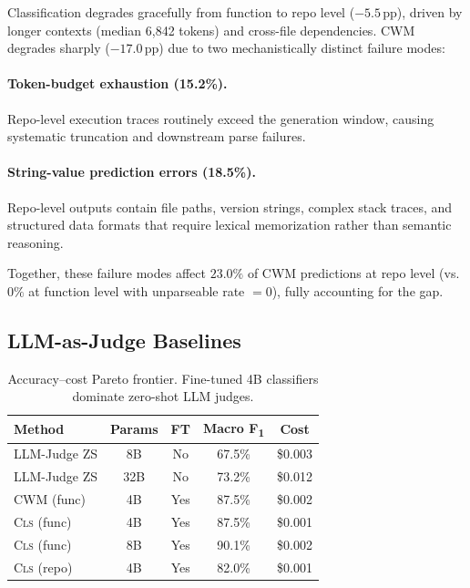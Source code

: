 \documentclass[11pt,a4paper]{article}
\newcommand{\cls}{\textsc{Cls}}
\newcommand{\fone}{F\textsubscript{1}}
\newcommand{\pp}{\,\text{pp}}
\begin{document}
Classification degrades gracefully from function to repo level ($-5.5\pp$), driven by longer contexts (median 6,842 tokens) and cross-file dependencies.
CWM degrades sharply ($-17.0\pp$) due to two mechanistically distinct failure modes:

\paragraph{Token-budget exhaustion (15.2\%).} Repo-level execution traces routinely exceed the generation window, causing systematic truncation and downstream parse failures.

\paragraph{String-value prediction errors (18.5\%).} Repo-level outputs contain file paths, version strings, complex stack traces, and structured data formats that require lexical memorization rather than semantic reasoning.

Together, these failure modes affect $23.0\%$ of CWM predictions at repo level (vs.\ $0\%$ at function level with unparseable rate $=0$), fully accounting for the gap.

\subsection{LLM-as-Judge Baselines}

\begin{table}[t]
\centering
\small
\begin{tabular}{lcccc}
\toprule
\textbf{Method} & \textbf{Params} & \textbf{FT} & \textbf{Macro \fone} & \textbf{Cost} \\
\midrule
LLM-Judge ZS & 8B & No & 67.5\% & \$0.003 \\
LLM-Judge ZS & 32B & No & 73.2\% & \$0.012 \\
CWM (func) & 4B & Yes & 87.5\% & \$0.002 \\
\cls{} (func) & 4B & Yes & 87.5\% & \$0.001 \\
\cls{} (func) & 8B & Yes & 90.1\% & \$0.002 \\
\cls{} (repo) & 4B & Yes & 82.0\% & \$0.001 \\
\bottomrule
\end{tabular}
\caption{Accuracy--cost Pareto frontier. Fine-tuned 4B classifiers dominate zero-shot LLM judges.}
\label{tab:pareto}
\end{table}
\end{document}
